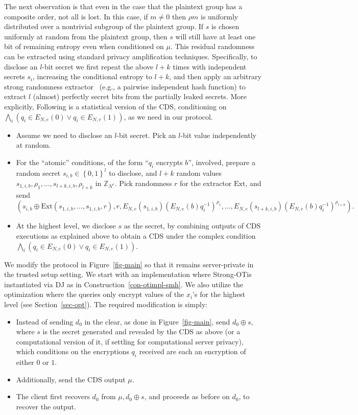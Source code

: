 \documentclass{article}
\newcommand{\set}[1]{\left\{#1\right\}}
\newcommand{\Z}{{\mathbb{Z}}}
\newcommand{\strongot}{{Strong-OT\;}}
\begin{document}
The next observation is that even in the case that the plaintext
group has a composite order, not all is lost. In this case, if
$m\neq 0$ then $\rho m$ is uniformly distributed over a nontrivial
subgroup of the plaintext group. If $s$ is chosen uniformly at
random from the plaintext group, then $s$ will still have at least
one bit of remaining entropy even when conditioned on $\mu$. This
residual randomness can be extracted using standard privacy
amplification techniques. Specifically, to disclose an $l$-bit
secret we first repeat the above $l+k$ times with independent
secrets $s_i$, increasing the conditional entropy to $l+k$, and
then apply an arbitrary strong randomness extractor~\cite{NZ}
(e.g., a pairwise independent hash function\cite{BBR,ILL,BBCM}) to
extract $l$ (almost) perfectly secret bits from the partially
leaked secrets. More explicitly, Following is a statistical version of the CDS, conditioning on $\bigwedge_i(q_i\in E_{N,e}(0)\vee q_i\in E_{N,e}(1))$,
as we need in our protocol.
\begin{itemize}
\item Assume we need to disclose an $l$-bit secret. Pick an $l$-bit value independently at random.
\item For the ``atomic'' conditions, of the form ``$q_i$ encrypts $b$'', involved, prepare a random secret
$s_{i,b}\in\set{0,1}^l$ to disclose, and $l+k$ random values $s_{1,i,b},\rho_1,\ldots,s_{l+k,i,b},\rho_{l+k}$ in $\Z_{N^e}$. Pick
randomness $r$ for the extractor $\text{Ext}$, and send \[(s_{i,b}\oplus \text{Ext}(s_{1,i,b},\ldots,s_{1,i,b},r),r,E_{N,e}(s_{1,i,b})(E_{N,e}(b)q^{-1}_i)^{\rho_1},\ldots,E_{N,e}(s_{l+k,i,b})(E_{N,e}(b)q^{-1}_i)^{\rho_{l+k}}).\]
\item At the highest level, we disclose $s$ as the secret, by combining outputs of CDS executions as explained above
to obtain a CDS under the complex condition $\bigwedge_i(q_i\in E_{N,e}(0)\vee q_i\in E_{N,e}(1))$.
\end{itemize}
We modify the protocol in Figure~\ref{fig-main} 
so that it remains server-private in the trusted setup setting. We start with an implementation
where \strongot is instantiated via DJ as in Construction~\ref{con-otimpl-smh}. We also utilize the optimization where the queries only encrypt values of the $x_i$'s for the highest level (see
Section~\ref{sec-opt}). The required modification is simply:
\begin{itemize}
\item Instead of sending $d_0$ in the clear, as done in Figure~\ref{fig-main}, send $d_0\oplus s$, where $s$ is the secret generated and revealed by the CDS as
above (or a computational version of it, if settling for computational server privacy), which conditions on the encryptions $q_i$ received are each an encryption of either $0$ or $1$.
\item Additionally, send the CDS output $\mu$.
\item The client first recovers $d_0$ from $\mu,d_0\oplus s$, and proceeds as before on $d_0$, to recover the output.
\end{itemize}
\end{document}
